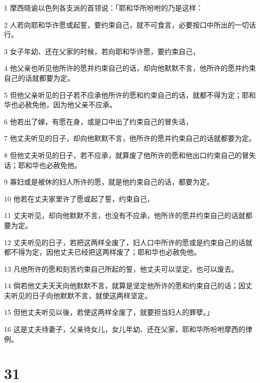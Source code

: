 \par 1 摩西晓谕以色列各支派的首领说：「耶和华所吩咐的乃是这样：
\par 2 人若向耶和华许愿或起誓，要约束自己，就不可食言，必要按口中所出的一切话行。
\par 3 女子年幼、还在父家的时候，若向耶和华许愿，要约束自己，
\par 4 他父亲也听见他所许的愿并约束自己的话，却向他默默不言，他所许的愿并约束自己的话就都要为定。
\par 5 但他父亲听见的日子若不应承他所许的愿和约束自己的话，就都不得为定；耶和华也必赦免他，因为他父亲不应承。
\par 6 他若出了嫁，有愿在身，或是口中出了约束自己的冒失话，
\par 7 他丈夫听见的日子，却向他默默不言，他所许的愿并约束自己的话就都要为定。
\par 8 但他丈夫听见的日子，若不应承，就算废了他所许的愿和他出口约束自己的冒失话；耶和华也必赦免他。
\par 9 寡妇或是被休的妇人所许的愿，就是他约束自己的话，都要为定。
\par 10 他若在丈夫家里许了愿或起了誓，约束自己，
\par 11 丈夫听见，却向他默默不言，也没有不应承，他所许的愿并约束自己的话就都要为定。
\par 12 丈夫听见的日子，若把这两样全废了，妇人口中所许的愿或是约束自己的话就都不得为定，因他丈夫已经把这两样废了；耶和华也必赦免他。
\par 13 凡他所许的愿和刻苦约束自己所起的誓，他丈夫可以坚定，也可以废去。
\par 14 倘若他丈夫天天向他默默不言，就算是坚定他所许的愿和约束自己的话；因丈夫听见的日子向他默默不言，就使这两样坚定。
\par 15 但他丈夫听见以後，若使这两样全废了，就要担当妇人的罪孽。」
\par 16 这是丈夫待妻子，父亲待女儿，女儿年幼、还在父家，耶和华所吩咐摩西的律例。

\chapter{31}

